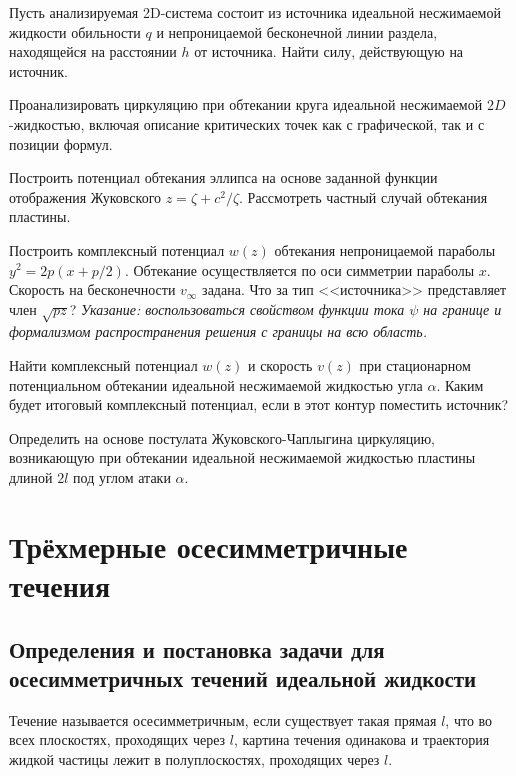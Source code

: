 \documentclass[a4paper, 14pt]{extarticle}
\begin{document}
\begin{problems}
	\item
	Пусть анализируемая 2D-система состоит из источника идеальной несжимаемой жидкости обильности $q$  и непроницаемой бесконечной линии раздела, находящейся на расстоянии $h$ от источника. Найти силу, действующую на источник.
	
	\item 
	Проанализировать циркуляцию при обтекании круга идеальной несжимаемой $2D$-жидкостью, включая описание критических точек как с графической, так и с позиции формул.
	
	\item 
	Построить потенциал обтекания эллипса на основе заданной функции отображения Жуковского $z = \zeta + c^2/\zeta$. Рассмотреть частный случай обтекания пластины.
	
	\item 
	Построить комплексный потенциал $w(z)$ обтекания непроницаемой параболы $y^2 = 2 p (x+p/2)$. Обтекание осуществляется по оси симметрии параболы $x$. Скорость на бесконечности $v_\infty$  задана.  Что за тип <<источника>> представляет член $\sqrt{pz}$? \textit{Указание: воспользоваться свойством функции тока $\psi$  на границе и формализмом распространения решения с границы на всю область.}
	
	\item
	Найти комплексный потенциал $w(z)$ и скорость $v(z)$ при стационарном потенциальном обтекании идеальной несжимаемой жидкостью угла $\alpha$. Каким будет итоговый комплексный потенциал, если в этот контур поместить источник?
	
	\item
	Определить на основе постулата Жуковского-Чаплыгина циркуляцию, возникающую при обтекании идеальной несжимаемой жидкостью пластины длиной $2l$ под углом атаки $\alpha$.
	
\end{problems}

\section{Трёхмерные осесимметричные течения}


\subsection{Определения и постановка задачи для осесимметричных течений идеальной жидкости}



\begin{dfn}
Течение называется \alert{осесимметричным}, если существует такая прямая $l$, что во всех плоскостях, проходящих через $l$, картина течения одинакова и траектория жидкой частицы лежит в полуплоскостях, проходящих через $l$.
\end{dfn}
\end{document}
